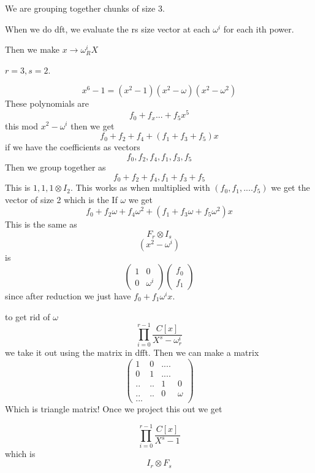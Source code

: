 \documentclass{article}
\begin{document}
	We are grouping together chunks of size 3.
	
	When we do dft, we evaluate the rs size vector at each $\omega^i$ for each ith power.
	
	Then we make $x \to \omega_R^iX$
	
	$r=3, s=2$.
	
	\begin{equation}
		x^6-1=(x^2-1)(x^2-\omega)(x^2-\omega^2)
	\end{equation}
	These polynomials are
	\begin{equation}
		f_0+f_x ...+f_5x^5
	\end{equation}
	this mod $x^2-\omega^i$ then we get
	\begin{equation}
		f_0+f_2+f_4 +(f_1+f_3+f_5)x
	\end{equation}
	if we have the coefficients as vectors
	\begin{equation}
		f_0, f_2, f_4, f_1, f_3, f_5
	\end{equation}
	Then we group together as
	\begin{equation}
		f_0+f_2+f_4, f_1+f_3+f_5
	\end{equation}
	This is $1, 1, 1 \otimes I_2$. This works as when multiplied with $(f_0, f_1,....f_5)$ we get the vector of size 2 which is the 
	If $\omega$ we get
	\begin{equation}
		f_0+f_2\omega+f_4\omega^2 +(f_1+f_3\omega+f_5\omega^2)x
	\end{equation}
	This is the same as
	\begin{equation}
		F_r \otimes I_s
	\end{equation}
	\begin{equation}
		(x^2-\omega^i)
	\end{equation}
	is
	\begin{equation}
		\begin{pmatrix}
			1 & 0 \\
			0 & \omega^i
		\end{pmatrix}
		\begin{pmatrix}
			f_0 \\
			f_1
		\end{pmatrix}
	\end{equation}
	since after reduction we just have $f_0+f_1\omega^ix$.
	
	to get rid of $\omega$
	\begin{equation}
		\prod_{i=0}^{r-1} \dfrac{C[x]}{X^s-\omega_r^i}
	\end{equation}
	we take it out using the matrix in dfft.
	Then we can make a matrix
	\begin{equation}
		\begin{pmatrix}
			1 & 0 & .... \\
			0 & 1 & .... \\
			.. & .. & 1 & 0 \\
			..& .. & 0 &  \omega \\
			...
		\end{pmatrix}
	\end{equation}
	Which is triangle matrix! Once we project this out we get
	
	\begin{equation}
		\prod_{i=0}^{r-1} \dfrac{C[x]}{X^s-1}
	\end{equation}
	which is
	\begin{equation}
		I_r \otimes F_s
	\end{equation}
\end{document}
